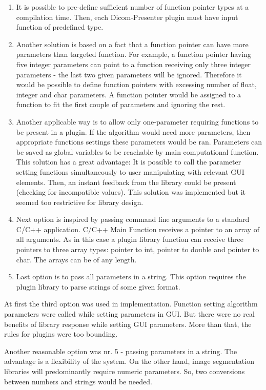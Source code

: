 \begin{enumerate}
\item It is possible to pre-define sufficient number of function pointer types at a compilation time. Then, each Dicom-Presenter plugin must have input function of predefined type.
\item Another solution is based on a fact that a function pointer can have more parameters than targeted function. For example, a function pointer having five integer parameters can point to a function receiving only three integer parameters - the last two given parameters will be ignored. Therefore it would be possible to define function pointers with excessing number of float, integer and char parameters. A function pointer would be assigned to a function to fit the first couple of parameters and ignoring the rest.
\item Another applicable way is to allow only one-parameter requiring functions to be present in a plugin. If the algorithm would need more parameters, then appropriate functions settings these parameters would be ran. Parameters can be saved as global variables to be reachable by main computational function. This solution has a great advantage: It is possible to call the parameter setting functions simultaneously to user manipulating with relevant GUI elements. Then, an instant feedback from the library could be present (checking for incompatible values). This solution was implemented but it seemed too restrictive for library design. 
\item Next option is inspired by passing command line arguments to a standard C/C++ application. C/C++ Main Function receives a pointer to an array of all arguments. As in this case a plugin library function can receive three pointers to three array types: pointer to int, pointer to double and pointer to char. The arrays can be of any length.
\item Last option is to pass all parameters in a string. This option requires the plugin library to parse strings of some given format. 
\end{enumerate}

At first the third option was used in implementation. Function setting algorithm parameters were called while setting parameters in GUI. But there were no real benefits of library response while setting GUI parameters. More than that, the rules for plugins were too bounding. 

Another reasonable option was nr. 5 - passing parameters in a string. The advantage is a flexibility of the system. On the other hand, image segmentation libraries will predominantly require numeric parameters. So, two conversions between numbers and strings would be needed.

